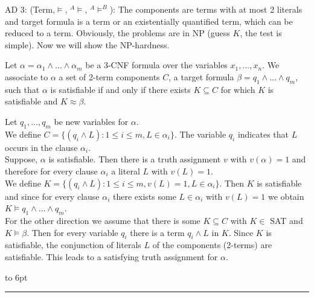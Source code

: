 \documentclass[12pt]{article}
\newcommand{\AMB}{\mbox{$^A$\hspace{-0.5mm}$\models^B$}}
\newcommand{\AM}{\mbox{$^A$\hspace{-0.5mm}$\models$}}
\newenvironment{proof}{\parindent=0pt{\bf Proof: }}{
   \hspace*{\fill}\hbox to 6pt{\leaders\hrule width 6pt height 6pt\hfill}\par}
\begin{document}
\begin{proof}
AD 3:  (Term,$\models$, \AM, \AMB): The components are terms with at most 2 literals and target formula is a term or an existentially quantified term, which can be reduced to a term. Obviously, the problems are in NP (guess $K$, the test
is simple). Now we will show the NP-hardness.

Let $\alpha = \alpha_1 \wedge \ldots \wedge \alpha_m$ be a 3-CNF formula over the variables $x_1, \ldots, x_n$. We associate
to $\alpha$ a set of 2-term components $C$, a target formula $\beta= q_1 \wedge \ldots \wedge q_m$, such that $\alpha$ is satisfiable if and only if
there exists $K \subseteq C$ for which $K$ is satisfiable and $K \approx\beta$.

Let $q_1, \ldots, q_m$ be new variables for $\alpha$.\\
We define $C=\{(q_i \wedge L) : 1 \leq i \leq m, L \in \alpha_i\}$. The variable $q_i$ indicates that $L$ occurs in the clause $\alpha_i$.\\
Suppose, $\alpha$ is satisfiable. Then there is a truth assignment $v$ with $v(\alpha)=1$ and therefore for every clause $\alpha_i$ a literal $L$ with $v(L)=1$.\\
We define $K = \{(q_i \wedge L) : 1 \leq i \leq m, v(L)=1, L \in \alpha_i\}$. Then $K$ is satisfiable and since
for every clause $\alpha_i$ there exists some $L \in \alpha_i$ with $v(L)=1$ we obtain $K \models q_1 \wedge \ldots \wedge q_m$.\\
For the other direction we assume that there is some $K \subseteq C$ with $K \in$ SAT and $K \models \beta$.
Then for every variable $q_i$ there is a term $q_i \wedge L$ in $K$. Since $K$ is satisfiable, the conjunction of literals $L$ of the components (2-terms) are satisfiable. This leads to a satisfying truth assignment for $\alpha$.
\end{proof}
\end{document}
